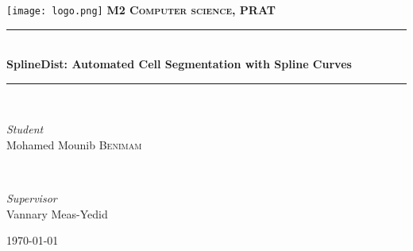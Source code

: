 \documentclass[a4paper, 12pt]{report}
\begin{document}
\begin{titlepage} 
	\newcommand{\HRule}{\rule{\linewidth}{0.5mm}} %
	\center %
	
    \texttt{[image: logo.png]}
	\vfill
	\textsc{\large{ \textbf{M2 Computer science, PRAT}\\[0.5cm] }} %
	
	
	\HRule\\[0.4cm]
	
	{\LARGE\bfseries SplineDist: Automated Cell Segmentation with Spline Curves}\\[0.1cm] %
	
	\HRule\\[1.5cm]
	
	
	\begin{minipage}{0.45\textwidth}
		\begin{flushleft}
			\large
			\textit{Student}\\
			Mohamed Mounib \textsc{Benimam}
		\end{flushleft}
	\end{minipage}
    ~~
	\begin{minipage}{0.45\textwidth}
		\begin{flushright}
			\large
			\textit{Supervisor}\\
			Vannary Meas-Yedid
		\end{flushright}
	\end{minipage}
	
	
	\vfill\vfill\vfill %
	
	{\large\today} 
	
	
	\vfill 
	
\end{titlepage}
\end{document}
